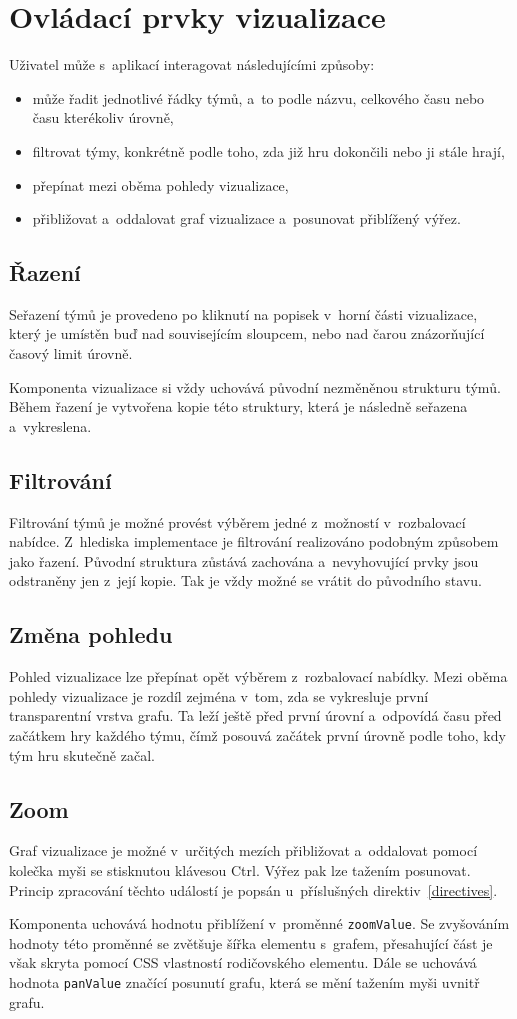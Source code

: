 \documentclass[
  digital, %
  oneside, %
  table,   %
  nolof,     %
  nolot,     %
]{fithesis3}
\begin{document}
\section{Ovládací prvky vizualizace} \label{interaction}
Uživatel může s~aplikací interagovat následujícími způsoby:
\begin{itemize}
  \item může řadit jednotlivé řádky týmů, a~to podle názvu, celkového času nebo času kterékoliv úrovně,
  \item filtrovat týmy, konkrétně podle toho, zda již hru dokončili nebo ji stále hrají,
  \item přepínat mezi oběma pohledy vizualizace,
  \item přibližovat a~oddalovat graf vizualizace a~posunovat přiblížený výřez.
\end{itemize}

\subsection{Řazení}
Seřazení týmů je provedeno po kliknutí na popisek v~horní části vizualizace, který je umístěn buď nad souvisejícím sloupcem, nebo nad čarou znázorňující časový limit úrovně.\par
Komponenta vizualizace si vždy uchovává původní nezměněnou strukturu týmů. Během řazení je vytvořena kopie této struktury, která je následně seřazena a~vykreslena.
\subsection{Filtrování}
Filtrování týmů je možné provést výběrem jedné z~možností v~rozbalovací nabídce. Z~hlediska implementace je filtrování realizováno podobným způsobem jako řazení. Původní struktura zůstává zachována a~nevyhovující prvky jsou odstraněny jen z~její kopie. Tak je vždy možné se vrátit do původního stavu.
\subsection{Změna pohledu}
Pohled vizualizace lze přepínat opět výběrem z~rozbalovací nabídky. Mezi oběma pohledy vizualizace je rozdíl zejména v~tom, zda se vykresluje první transparentní vrstva grafu. Ta leží ještě před první úrovní a~odpovídá času před začátkem hry každého týmu, čímž posouvá začátek první úrovně podle toho, kdy tým hru skutečně začal.
\subsection{Zoom}
Graf vizualizace je možné v~určitých mezích přibližovat a~oddalovat pomocí kolečka myši se stisknutou klávesou Ctrl. Výřez pak lze tažením posunovat. Princip zpracování těchto událostí je popsán u~příslušných direktiv~\ref{directives}.\par
Komponenta uchovává hodnotu přiblížení v~proměnné \verb|zoomValue|. Se zvyšováním hodnoty této proměnné se zvětšuje šířka elementu s~grafem, přesahující část je však skryta pomocí CSS vlastností rodičovského elementu. Dále se uchovává hodnota \verb|panValue| značící posunutí grafu, která se mění tažením myši uvnitř grafu. 
\end{document}
